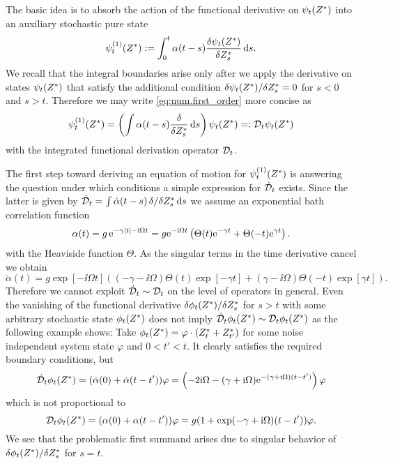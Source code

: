 The basic idea is to absorb the action of the functional derivative on $\psitZ$ into an auxiliary stochastic pure state
\begin{equation}
  \psitZ[1] := \int_0^t \alpha(t - s) \frac{\delta \psi_t(\ZZ)}{\delta \ZZ_s} \dd s.
  \label{eq:num.first_order}
\end{equation}
We recall that the integral boundaries arise only after we apply the derivative on states $\psi_t({Z}^*)$ that satisfy the additional condition $\delta \psitZ / \delta \ZZ_s = 0$ for $ s < 0$ and $s > t$.
Therefore we may write \autoref{eq:num.first_order} more concise as
\begin{equation*}
  \psitZ[1] = \left( \int \alpha(t - s) \frac{\delta}{\delta \ZZ_s} \dd s \right) \psitZ =: \adjZZ_t \psitZ
\end{equation*}
with the integrated functional derivation operator $\mathcal{D}_t$.

The first step toward deriving an equation of motion for $\psitZ[1]$ is answering the question under which conditions a simple expression for $\dot{\mathcal{D}}_t$ exists.
Since the latter is given by $\dot{\mathcal{D}}_t = \int\dot\alpha(t-s) \, \delta / \delta {Z}^*_s \, \mathrm{d} s$ we assume an exponential bath correlation function
\begin{equation}
  \alpha(t) = g \, \exp[-\gamma \abs{t} - \ii \Omega t] = g \exp[-\ii \Omega t] \left( \Theta(t) \exp[-\gamma t] + \Theta(-t) \exp[\gamma t] \right).
  \label{eq:num.exp_bcf}
\end{equation}
with the Heaviside function $\Theta$.
As the singular terms in the time derivative cancel we obtain
\begin{equation*}
  \dot\alpha(t) = g \exp[-\ii \Omega t] \left( (-\gamma - \ii\Omega) \Theta(t) \exp[-\gamma t] + (\gamma - \ii\Omega)\Theta(-t)\exp[\gamma t] \right).
\end{equation*}
Therefore we cannot exploit $\dot{\mathcal{D}}_t \sim \mathcal{D}_t$ on the level of operators in general.
Even the vanishing of the functional derivative $\delta \phi_t({Z}^*) / \delta {Z}^*_s$ for $s > t$ with some arbitrary stochastic state $\phi_t({Z}^*)$ does not imply $\dot{\mathcal{D}}_t \phi_t({Z}^*) \sim \mathcal{D}_t\phi_t({Z}^*)$ as the following example shows:
Take $\phi_t({Z}^*) = \varphi \cdot ({Z}^*_t + {Z}^*_{t'})$ for some noise independent system state $\varphi$ and $0 < t' < t$.
It clearly satisfies the required boundary conditions, but
\begin{equation*}
  \dot\adjZZ_t \phi_t(\ZZ) = (\dot\alpha(0) + \dot\alpha(t-t')) \varphi = \left( -2\ii\Omega - (\gamma + \ii\Omega) \exp[-(\gamma + \ii\Omega) (t-t')] \right) \varphi
\end{equation*}
which is not proportional to
\begin{equation*}
  \adjZZ_t \phi_t(\ZZ) = (\alpha(0) + \alpha(t - t')) \varphi = g (1 + \exp(-\gamma + \ii \Omega)(t-t')) \varphi.
\end{equation*}
We see that the problematic first summand arises due to singular behavior of $\delta \phi_t({Z}^*) / \delta {Z}^*_s$ for $s = t$.

